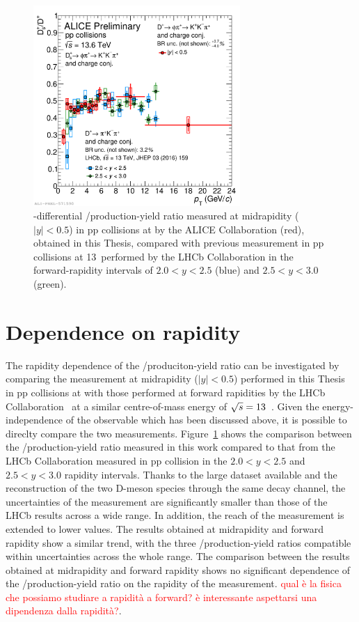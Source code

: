 \begin{figure}[tb]
    \centering
    \includegraphics[width=0.7\textwidth]{Figures/Chapter 7/dsoverdpluscomparisonlhcb.pdf}
    \caption{\pt-differential \ds/\dpl production-yield ratio measured at midrapidity ($\lvert y\rvert<0.5$) in pp collisions at \thirteen by the ALICE Collaboration (red), obtained in this Thesis, compared with previous measurement in pp collisions at 13~\tev performed by the LHCb Collaboration in the forward-rapidity intervals of $2.0<y<2.5$ (blue) and $2.5<y<3.0$ (green).}
    \label{fig:dsdplvsrapidity}
\end{figure}
\section{Dependence on rapidity}
The rapidity dependence of the \ds/\dpl produciton-yield ratio can be investigated by comparing the measurement at midrapidity ($\lvert y\rvert<0.5$) performed in this Thesis in pp collisions at \thirteen with those performed at forward rapidities by the LHCb Collaboration~\cite{LHCb:2015swx} at a similar centre-of-mass energy of $\sqrt{s}=13$~\tev. Given the energy-independence of the observable which has been discussed above, it is possible to direclty compare the two measurements. Figure~\ref{fig:dsdplvsrapidity} shows the comparison between the \ds/\dpl production-yield ratio measured in this work compared to that from the LHCb Collaboration measured in pp collision in the $2.0<y<2.5$ and $2.5<y<3.0$ rapidity intervals. Thanks to the large dataset available and the reconstruction of the two D-meson species through the same decay channel, the uncertainties of the measurement are significantly smaller than those of the LHCb results across a wide \pt range. In addition, the \pt reach of the measurement is extended to lower values. The results obtained at midrapidity and forward rapidity show a similar trend, with the three \ds/\dpl production-yield ratios compatible within uncertainties across the whole \pt range. The comparison between the results obtained at midrapidity and forward rapidity shows no significant dependence of the \ds/\dpl production-yield ratio on the rapidity of the measurement.
\textcolor{red}{qual è la fisica che possiamo studiare a rapidità a forward? è interessante aspettarsi una dipendenza dalla rapidità?}. 


